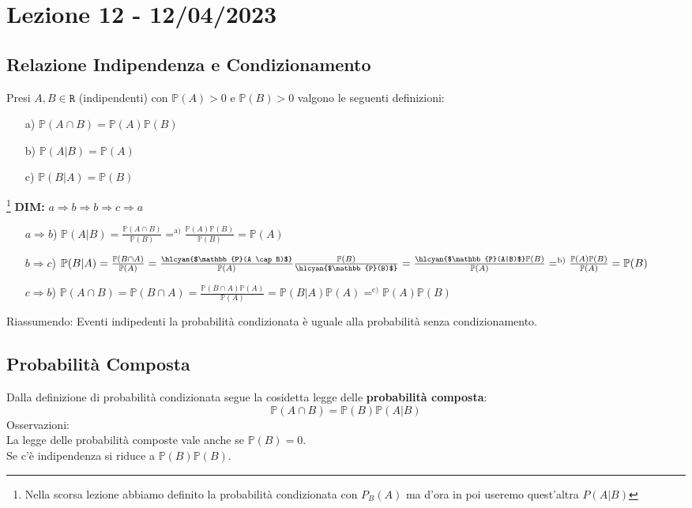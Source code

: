 \section{Lezione 12 - 12/04/2023}

\subsection{Relazione Indipendenza e Condizionamento}
Presi $A,B \in \mathtt{R}$ (indipendenti) con $\mathbb{P}(A) > 0$ e $\mathbb{P}(B) > 0$ valgono le seguenti definizioni:
\begin{itemize}
\item[a)] $\mathbb{P}(A \cap B) = \mathbb{P}(A) \mathbb{P}(B)$
\item[b)] $\mathbb{P}(A|B) = \mathbb{P}(A)$
\item[c)] $\mathbb{P}(B|A) = \mathbb{P}(B)$
\end{itemize}
\footnote{Nella scorsa lezione abbiamo definito la probabilità condizionata con $P_B(A)$ ma d'ora in poi useremo quest'altra $P(A|B)$}
\textbf{DIM:} $ a \Rightarrow b \Rightarrow b \Rightarrow c \Rightarrow a$
\begin{itemize}
\item[$a \Rightarrow b$)] $\mathbb{P}(A|B) = \frac{\mathbb{P}(A \cap B)}{\mathbb{P}(B)} =^\text{a)} \frac{\mathbb{P}(A) \mathbb{P}(B)}{\mathbb{P}(B)} = \mathbb{P}(A)$

\item[$b \Rightarrow c$)]$ \mathbb{P}(B|A) =  \frac{\mathbb{P}(B \cap A)}{\mathbb{P}(A)} = \frac{\text{\hlcyan{$\mathbb{P}(A \cap B)$}}}{\mathbb{P}(A)} \frac{\mathbb{P}(B)}{\text{\hlcyan{$\mathbb{P}(B)$}}} = \frac{\text{\hlcyan{$\mathbb{P}(A|B)$}} \mathbb{P}(B)}{\mathbb{P}(A)} =^\text{b)} \frac{\mathbb{P}(A) \mathbb{P}(B)}{\mathbb{P}(A)} = \mathbb{P}(B)$

\item[$c \Rightarrow b$)] $ \mathbb{P}(A \cap B) = \mathbb{P}(B \cap A) = \frac{\mathbb{P}(B \cap A) \mathbb{P}(A)}{\mathbb{P}(A)} = \mathbb{P}(B|A) \mathbb{P}(A) =^\text{c)} \mathbb{P}(A) \mathbb{P}(B)$

\end{itemize}

Riassumendo: Eventi indipedenti la probabilità condizionata è uguale alla probabilità senza condizionamento.\\

\subsection{Probabilità Composta}
Dalla definizione di probabilità condizionata segue la cosidetta legge delle \textbf{probabilità composta}:
$$ \mathbb{P}(A \cap B) = \mathbb{P}(B) \mathbb{P}(A|B)  $$
Osservazioni:\\
La legge delle probabilità composte vale anche se $\mathbb{P}(B) = 0$.\\
Se c'è indipendenza si riduce a $\mathbb{P}(B) \mathbb{P}(B)$.\\
